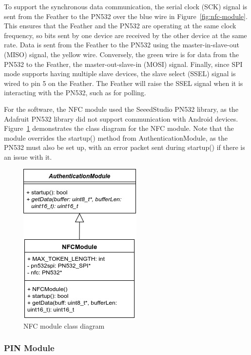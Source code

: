 \documentclass[12pt]{report}
\let\Oldsubsubsection\subsubsection
\renewcommand{\subsubsection}{\FloatBarrier\Oldsubsubsection}
\begin{document}
To support the synchronous data communication, the serial clock (SCK) signal is sent from the Feather to the PN532 over 
the blue wire in Figure~\ref{fig:nfc-module}. This ensures that the Feather and the PN532 are operating at the same 
clock frequency, so bits sent by one device are received by the other device at the same rate. Data is sent from the 
Feather to the PN532 using the master-in-slave-out (MISO) signal, the yellow wire. Conversely, the green wire is for 
data from the PN532 to the Feather, the master-out-slave-in (MOSI) signal. Finally, since SPI mode supports having 
multiple slave devices, the slave select (SSEL) signal is wired to pin 5 on the Feather. The Feather will raise the 
SSEL signal when it is interacting with the PN532, such as for polling.

For the software, the NFC module used the SeeedStudio PN532 library, as the Adafruit PN532 library did not support 
communication with Android devices. Figure~\ref{fig:nfc-module-class} demonstrates the class diagram for the NFC 
module. Note that the module overrides the startup() method from AuthenticationModule, as the PN532 must also be set 
up, with an error packet sent during startup() if there is an issue with it.


\begin{figure}
    \centering
    \includegraphics{Diagrams/Hardware-Diagrams/nfc_module_class}
    \caption{NFC module class diagram}
    \label{fig:nfc-module-class}
\end{figure}

\subsubsection{PIN Module} \label{pin-modules}
\end{document}
